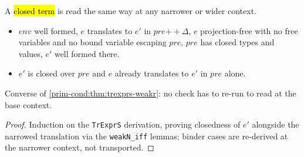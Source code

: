 \begin{theorem}
  \label{prim-cond:thm:trexprs-ofclosed}
  \leanok

   A \hl{closed term} is read the same way at any narrower or wider context.
  \begin{itemize}
  \item {} $\mathit{env}$ well formed, $e$ translates to $e'$ in $\mathit{pre}
    \mathbin{+\!\!+} \Delta$, $e$ projection-free with no free variables and no bound variable
    escaping $\mathit{pre}$, $\mathit{pre}$ has closed types and values, $e'$ well formed there.
  \item {} $e'$ is closed over $\mathit{pre}$ and $e$ already translates to $e'$ in
    $\mathit{pre}$ alone.
  \end{itemize}
  Converse of \ref{prim-cond:thm:trexprs-weakr}: no check has to re-run to read at the base context.
\end{theorem}
\begin{proof}
  \leanok
   Induction on the \texttt{TrExprS} derivation, proving closedness of $e'$ alongside
  the narrowed translation via the \texttt{weakN\_iff} lemmas; binder cases are re-derived at the
  narrower context, not transported.
\end{proof}

